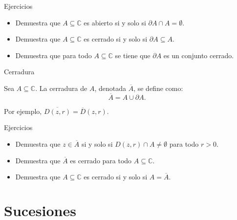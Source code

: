 \documentclass[spanish,presentation]{beamer}
\begin{document}
\begin{frame}[label=sec-1-6]{Ejercicios}
\begin{itemize}
\item Demuestra que \(A\subseteq \mathbb{C}\) es abierto si y solo si \(\partial A\cap A=\emptyset\).
\item Demuestra que \(A\subseteq \mathbb{C}\) es cerrado si y solo si \(\partial A\subseteq A\).
\item Demuestra que para todo \(A\subseteq \mathbb{C}\) se tiene que \(\partial A\) es un
conjunto cerrado.
\end{itemize}
\end{frame}

\begin{frame}[label=sec-1-7]{Cerradura}
\begin{definition}[Cerradura]
Sea \(A\subseteq \mathbb{C}\). La \alert{cerradura} de \(A\), denotada
\(\overline{A}\), se define como:
\begin{displaymath}
\overline{A}=A\cup\partial A.
\end{displaymath}
\end{definition}

\begin{exampleblock}{}
Por ejemplo, \(\overline{D(z,r)}=\overline{D}(z,r)\).
\end{exampleblock}

\begin{block}{Ejercicios}
\begin{itemize}
\item Demuestra que \(z\in \overline{A}\) si y solo si \(D(z,r)\cap
      A\ne\emptyset\) para todo \(r>0\).
\item Demuestra que \(\overline{A}\) es cerrado para todo \(A\subseteq \mathbb{C}\).
\item Demuestra que \(A\subseteq \mathbb{C}\) es cerrado si y solo si \(A=\overline{A}\).
\end{itemize}
\end{block}
\end{frame}

\section{Sucesiones}
\label{sec-2}
\end{document}
